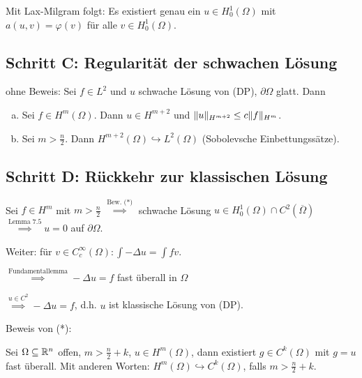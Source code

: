 Mit Lax-Milgram folgt: Es existiert genau ein $u \in H_0^1(\Omega)$ mit $a(u,v) = \varphi(v)$ für alle $v \in H_0^1(\Omega)$.

\subsection*{Schritt C: Regularität der schwachen Lösung}

ohne Beweis: Sei $f \in L^2$ und $u$ schwache Lösung von (DP), $\partial \Omega$ glatt. Dann
\begin{enumerate}[a)]
  \item Sei $f \in H^m(\Omega)$. Dann $u \in H^{m+2}$ und $\lVert u \rVert_{H^{m+2}} \leq c \lVert f \rVert_{H^m}$.
  \item Sei $m > \frac{n}{2}$. Dann $H^{m+2}(\Omega) \hookrightarrow L^2(\Omega)$ (Sobolevsche Einbettungssätze).
\end{enumerate}

\subsection*{Schritt D: Rückkehr zur klassischen Lösung}

Sei $f \in H^m$ mit $m > \frac{n}{2}$ $\overset{\text{Bew. (*)}}\implies$ schwache Lösung $u \in H_0^1(\Omega) \cap C^2(\overline\Omega)$ $\overset{\text{Lemma 7.5}}{\implies} u = 0$ auf $\partial \Omega$.

Weiter: für $v \in C_c^\infty(\Omega) \colon \int -\Delta u = \int fv$.

$\overset{\text{Fundamentallemma}}{\implies} -\Delta u = f$ fast überall in $\Omega$

$\overset{u \in C^2}{\implies} -\Delta u = f$, d.h. $u$ ist klassische Lösung von (DP).

Beweis von (*):
\begin{lem}
  Sei $\Omega \subseteq \mathbb{R}^n$ offen, $m > \frac{n}{2} + k$, $u \in H^m(\Omega)$, dann existiert $g \in C^k(\Omega)$ mit $g = u$ fast überall.
  Mit anderen Worten: $H^m(\Omega) \hookrightarrow C^k(\Omega)$, falls $m > \frac{n}{2} + k$.
\end{lem}

